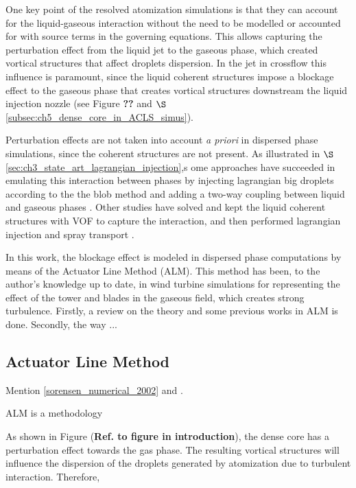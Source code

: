 One key point of the resolved atomization simulations is that they can account for the liquid-gaseous interaction without the need to be modelled or accounted for with source terms in the governing equations. This allows capturing the perturbation effect from the liquid jet to the gaseous phase, which created vortical structures that affect droplets dispersion. In the jet in crossflow this influence is paramount, since the liquid coherent structures impose a blockage effect to the gaseous phase that creates vortical structures downstream the liquid injection nozzle (see Figure \textbf{??} and $\S$\ref{subsec:ch5_dense_core_in_ACLS_simus}).

Perturbation effects are not taken into account \textsl{a priori} in dispersed phase simulations, since the coherent structures are not present. As illustrated in $\S$\ref{sec:ch3_state_art_lagrangian_injection},s ome approaches have succeeded in emulating this interaction between phases by injecting lagrangian big droplets according to the the blob method  and adding a two-way coupling between liquid and gaseous phases . Other studies have solved and kept the liquid coherent structures with VOF to capture the interaction, and then performed lagrangian injection and spray transport .

In this work, the blockage effect is modeled in dispersed phase computations by means of the Actuator Line Method (ALM). This method has been, to the author's knowledge up to date, in wind turbine simulations for representing the effect of the tower and blades in the gaseous field, which creates strong turbulence. Firstly, a review on the theory and some previous works in ALM is done. Secondly, the way ...



\subsection{Actuator Line Method}

Mention \ref{sorensen_numerical_2002} and .

ALM is a methodology


As shown in Figure (\textbf{Ref. to figure in introduction}), the dense core has a perturbation effect towards the gas phase. The resulting vortical structures will influence the dispersion of the droplets generated by atomization due to turbulent interaction. Therefore,

